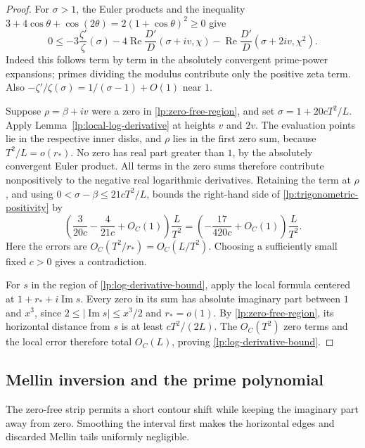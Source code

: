 \begin{proof}
For $\sigma>1$, the Euler products and the inequality
$3+4\cos\theta+\cos(2\theta)=2(1+\cos\theta)^2\ge0$ give
\begin{equation}\label{lp:trigonometric-positivity}
 0\le-3\frac{\zeta'}\zeta(\sigma)
       -4\operatorname{Re}\frac{D'}D(\sigma+iv,\chi)
       -\operatorname{Re}\frac{D'}D(\sigma+2iv,\chi^2).
\end{equation}
Indeed this follows term by term in the absolutely convergent
prime-power expansions; primes dividing the modulus contribute only
the positive zeta term.  Also
$-\zeta'/\zeta(\sigma)=1/(\sigma-1)+O(1)$ near $1$.

Suppose $\rho=\beta+iv$ were a zero in
\eqref{lp:zero-free-region}, and set
$\sigma=1+20cT^2/L$.  Apply
Lemma~\ref{lp:local-log-derivative} at heights $v$ and $2v$.
The evaluation points lie in the respective inner disks, and $\rho$
lies in the first zero sum, because $T^2/L=o(r_*)$.
No zero has real part greater than $1$, by the absolutely convergent
Euler product.  All terms in the zero sums therefore contribute
nonpositively to the negative real logarithmic derivatives.  Retaining
the term at $\rho$, and using
$0<\sigma-\beta\le21cT^2/L$, bounds the right-hand side of
\eqref{lp:trigonometric-positivity} by
\[
 \left(\frac{3}{20c}-\frac{4}{21c}+O_C(1)\right)\frac L{T^2}
 =\left(-\frac{17}{420c}+O_C(1)\right)\frac L{T^2}.
\]
Here the errors are $O_C(T^2/r_*)=O_C(L/T^2)$.
Choosing a sufficiently small fixed $c>0$ gives a contradiction.

For $s$ in the region of \eqref{lp:log-derivative-bound}, apply the
local formula centered at $1+r_*+i\operatorname{Im}s$.
Every zero in its sum has absolute imaginary part between $1$ and
$x^3$, since $2\le|\operatorname{Im}s|\le x^3/2$ and $r_*=o(1)$.
By \eqref{lp:zero-free-region}, its horizontal distance from $s$ is
at least $cT^2/(2L)$.  The $O_C(T^2)$ zero terms and the local error
therefore total $O_C(L)$, proving
\eqref{lp:log-derivative-bound}.
\end{proof}

\subsection{Mellin inversion and the prime polynomial}

The zero-free strip permits a short contour shift while keeping the
imaginary part away from zero. Smoothing the interval first makes the
horizontal edges and discarded Mellin tails uniformly negligible.

